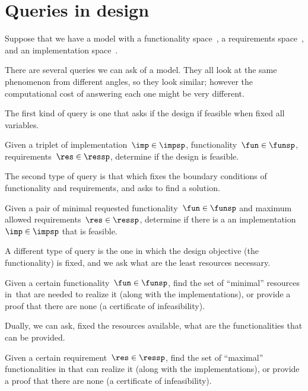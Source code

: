 
\section{Queries in design}


Suppose that we have a model with a functionality space~\funsp, a requirements space~\ressp, and an implementation space~\impsp.

There are several queries we can ask of a model.
They all look at the same phenomenon from different angles, so they look similar;
however the computational cost of answering each one might be very different.

The first kind of query is one that asks if the design if feasible when fixed all variables.

\begin{problem}
Given a triplet of implementation~$\imp\in\impsp$, functionality~$\fun\in\funsp$, requirements~$\res\in\ressp$, determine if the design is feasible.
\end{problem}

The second type of query is that which fixes the boundary conditions of functionality and requirements, and asks to find a solution.

\begin{problem}
Given a pair of minimal requested functionality~$\fun\in\funsp$ and maximum allowed requirements~$\res\in\ressp$, determine if there is a an implementation~$\imp\in\impsp$ that is feasible.
\end{problem}

A different type of query is the one in which the design objective (the functionality) is fixed, and we ask what are the least resources necessary.

\begin{problem}[FixFunMinRes]
\label{prob:FixFunMinRes-informal}
Given a certain functionality~$\fun\in\funsp$, find the set of ``minimal'' resources in~\ressp that are needed to realize it (along with the implementations), or provide a proof that there are none (a certificate of infeasibility).
\end{problem}

Dually, we can ask, fixed the resources available, what are the functionalities that can be provided.

\begin{problem}[FixReqMinFun]
\label{prob:FixReqMinFun-informal}
Given a certain requirement~$\res\in\ressp$, find the set of ``maximal'' functionalities in that can realize it (along with the implementations), or provide a proof that there are none (a certificate of infeasibility).
\end{problem}

